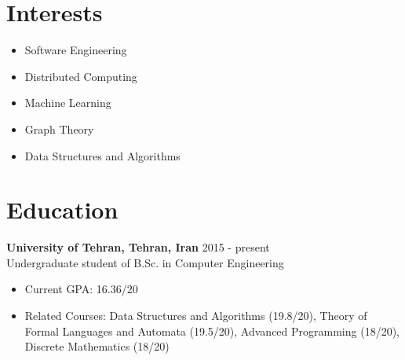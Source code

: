 \documentclass[margin]{res}
\begin{document}
 
 
 
\address{No. 14, Tanhajou Street, \\Tehranpars 3rd Square, \\Tehran, Iran}
\address{Email: shayan.hosseini@ut.ac.ir \\ Cell: +98-919-6421171}

 
\begin{resume} 

\vspace{2mm}


\vspace{5mm}


\section{Interests}
	\begin{itemize}
	\item Software Engineering
	\item Distributed Computing
	\item Machine Learning
	\item Graph Theory
	\item Data Structures and Algorithms
	\end{itemize}

\section{Education}
    {\bf University of Tehran, Tehran, Iran} \hfill 2015 - present
    \\Undergraduate student of B.Sc. in Computer Engineering
    
   	\begin{itemize}
	\item Current GPA: 16.36/20
	\item Related Courses: Data Structures and Algorithms (19.8/20),
	Theory of Formal Languages and Automata (19.5/20), Advanced Programming (18/20),
	Discrete Mathematics (18/20)
	\end{itemize}


\end{resume}
\end{document}
